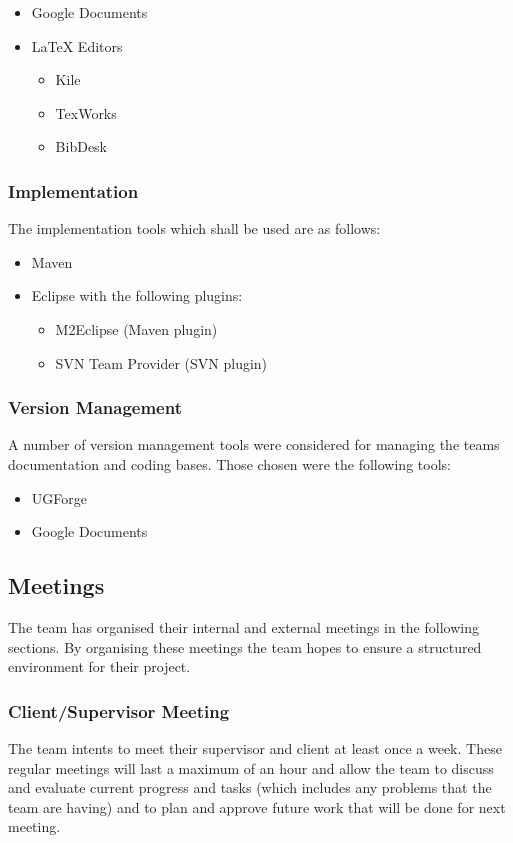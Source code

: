 \begin{itemize}
	\item{Google Documents}
	\item{LaTeX Editors}
	\begin{itemize}
		\item{Kile}
		\item{TexWorks}
		\item{BibDesk}
	\end{itemize}
\end{itemize}

\subsubsection{Implementation}

The implementation tools which shall be used are as follows:
	
\begin{itemize}
	\item{Maven}
	\item{Eclipse with the following plugins:}
	\begin{itemize}
		\item{M2Eclipse (Maven plugin)}
		\item{SVN Team Provider (SVN plugin)}
	\end{itemize}
\end{itemize}

\subsubsection{Version Management}

A number of version management tools were considered for managing the teams documentation and coding bases. Those chosen were the following tools:

\begin{itemize}
	\item{UGForge}
	\item{Google Documents}
\end{itemize}

\subsection{Meetings}

The team has organised their internal and external meetings in the following sections. By organising these meetings the team hopes to ensure a structured environment for their project.

\subsubsection{Client/Supervisor Meeting}
The team intents to meet their supervisor and client at least once a week. These regular meetings will last a maximum of an hour and allow the team to discuss and evaluate current progress and tasks (which includes any problems that the team are having) and to plan and approve future work that will be done for next meeting.

